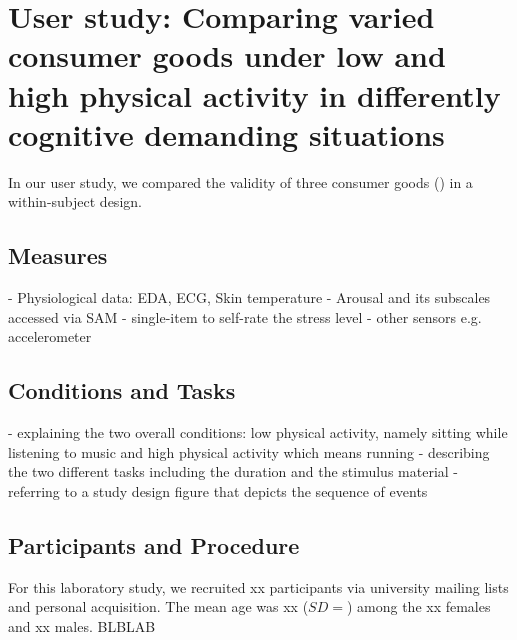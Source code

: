 \section{User study: Comparing varied consumer goods under low and high physical activity in differently cognitive demanding situations}

In our user study, we compared the validity of three consumer goods () in a within-subject design.  

\subsection{Measures} 

- Physiological data: EDA, ECG, Skin temperature
- Arousal and its subscales accessed via SAM
- single-item to self-rate the stress level 
- other sensors e.g. accelerometer

\subsection{Conditions and Tasks}

- explaining the two overall conditions: low physical activity, namely sitting while listening to music and high physical activity which means running 
- describing the two different tasks including the duration and the stimulus material 
- referring to a study design figure that depicts the sequence of events

\subsection{Participants and Procedure}

For this laboratory study, we recruited xx participants via university mailing lists and personal acquisition. The mean age was xx ($ SD = $) among the xx females and xx males. 
BLBLAB